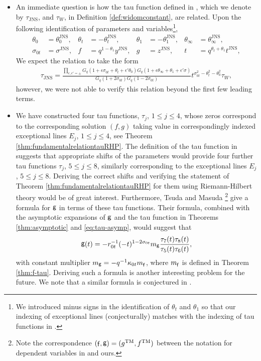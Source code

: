\documentclass[a4paper,reqno,11pt]{amsart}
\numberwithin{equation}{section}
\numberwithin{figure}{section}
\theoremstyle{plain}
\theoremstyle{remark}
\DeclareMathOperator{\sff}{{\sf f}}
\DeclareMathOperator{\sfg}{{\sf g}}
\numberwithin{rhp}{section}
\begin{document}
\begin{itemize}[leftmargin=*]
\item An immediate question is how the tau function defined in \cite{JNS2017}, which we denote by $\tau_\text{JNS}$, and $\tau_{W}$, in Definition \ref{def:widomconstant}, are related. Upon the following identification of parameters and variables\footnote{We introduced minus signs in the identification of $\theta_t$ and $\theta_1$ so that our indexing of exceptional lines (conjecturally) matches with the indexing of tau functions in \cite{JNS2017}.},
\begin{align*}
    \theta_0&=\theta_0^{\operatorname{JNS}}, & 
    \theta_t&=-\theta_t^{\operatorname{JNS}}, & 
    \theta_1&=-\theta_1^{\operatorname{JNS}}, & 
    \theta_\infty&=\theta_\infty^{\operatorname{JNS}}, \\
   \sigma_{0t}&=\sigma^{\operatorname{JNS}}, &
   f&=q^{1-\theta_1}y^{\operatorname{JNS}}, &
   g&=z^{\operatorname{JNS}}, &
   t&=q^{\theta_t+\theta_1}t^{\operatorname{JNS}},
\end{align*}
We expect the relation to take the form
\begin{align}
    \tau_{\text{JNS}} = \frac{\prod_{\epsilon, \epsilon' = \pm}G_q(1+\epsilon \sigma_{0t}  + \theta_t + \epsilon' \theta_0) G_q(1+\epsilon \theta_{\infty}  + \theta_1 + \epsilon' \sigma)}{G_q(1+2\sigma_{0t}) G_q(1-2\sigma_{0t})} t^{\sigma_{0t}^2 - \theta_t^2 - \theta_0^2} \tau_{W},
\end{align}
however, we were not able to verify this relation beyond the first few leading terms.
\item We have constructed four tau functions, $\tau_j$, $1\leq j\leq 4$, whose zeros correspond to the corresponding solution $(f,g)$ taking value in correspondingly indexed exceptional lines $E_j$, $1\leq j\leq 4$, see Theorem \ref{thm:fundamentalrelationtauRHP}. The definition of the tau function in \cite{tsudamasuda} suggests that appropriate shifts of the parameters would provide four further tau functions $\tau_j$, $5\leq j\leq 8$, similarly corresponding to the exceptional lines $E_j$, $5\leq j\leq 8$. Deriving the correct shifts and verifying the statement of Theorem \ref{thm:fundamentalrelationtauRHP} for them using Riemann-Hilbert theory would be of great interest. Furthermore, Tsuda and Masuda \cite[Theorem 2.3]{tsudamasuda}\footnote{Note the correspondence $(\sff, \sfg)=(g^{\operatorname{TM}},f^{\operatorname{TM}})$ between the notation for dependent variables in \cite{tsudamasuda} and ours.} give a formula for  $\sfg$ in terms of these tau functions. Their formula, combined with the asymptotic expansions of $\sfg$ and the tau function in Theorems \ref{thm:asymptotic} and \ref{eq:tau-asymp}, would suggest that
    \begin{align}\label{g-conj}
           \sfg(t) =  -r_{0t}^{-1}(-t)^{1-2 \sigma_{0t}}m_{\sfg}\frac{\tau_7(t) \tau_8 (t)}{\tau_5(t) \tau_6(t)},
    \end{align}
    with constant multiplier $m_{\sfg}=-q^{-1}\kappa_{0t}m_{\sff}$, where $m_{\sff}$ is defined in Theorem \ref{thm:f-tau}.
Deriving such a formula is another interesting problem for the future. We note that
a similar formula is conjectured in \cite[Conjecture 3.4]{JNS2017}. 


\end{itemize}
\end{document}
